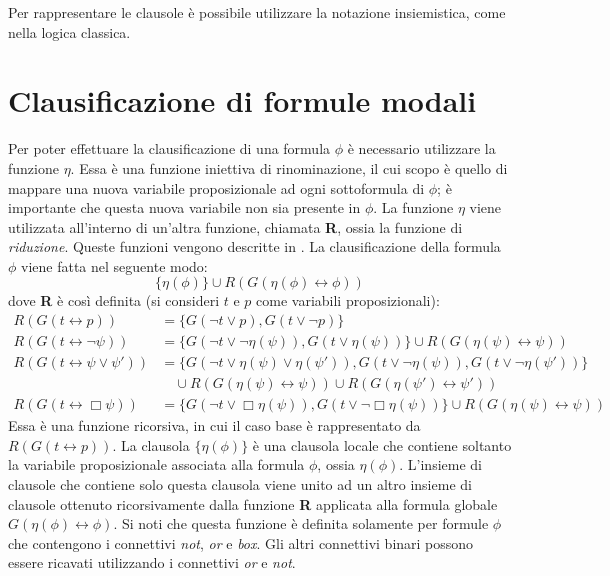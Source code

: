 \documentclass[a4paper,12pt]{report}
\newcommand{\tto} {\leftrightarrow}
\begin{document}
Per rappresentare le clausole è possibile utilizzare la notazione insiemistica, come nella logica classica.

\section{Clausificazione di formule modali}
\label{modal_claus}
Per poter effettuare la clausificazione di una formula $\phi$ è necessario utilizzare la funzione $\eta$. Essa è una funzione iniettiva di rinominazione, il cui scopo è quello di mappare una nuova variabile proposizionale ad ogni sottoformula di $\phi$; è importante che questa nuova variabile non sia presente in $\phi$. La funzione $\eta$ viene utilizzata all'interno di un'altra funzione, chiamata \textbf{R}, ossia la funzione di \emph{riduzione}. Queste funzioni vengono descritte in \cite{Articolo_resolution}. La clausificazione della formula $\phi$ viene fatta nel seguente modo:
\[ \{ \eta(\phi) \} \cup R(G(\eta(\phi) \tto \phi)) \]
dove \textbf{R} è così definita (si consideri $t$ e $p$ come variabili proposizionali):
\[
\begin{aligned}
R(G(t \tto p)) &= \{ G(\lnot t \lor p), G(t \lor \lnot p) \} \\
R(G(t \tto \lnot \psi)) &= \{ G(\lnot t \lor \lnot \eta(\psi)), G(t \lor \eta(\psi)) \} \cup R(G(\eta(\psi) \tto \psi)) \\
R(G(t \tto \psi \lor \psi')) &= \{ G(\lnot t \lor \eta(\psi) \lor \eta(\psi')), G(t \lor \lnot \eta(\psi)), G(t \lor \lnot \eta(\psi')) \} \\
& \quad \cup R(G(\eta(\psi) \tto \psi)) \cup R(G(\eta(\psi') \tto \psi')) \\
R(G(t \tto \Box \psi)) &= \{ G(\lnot t \lor \Box \eta(\psi)), G(t \lor \lnot \Box \eta(\psi)) \} \cup R(G(\eta(\psi) \tto \psi))
\end{aligned}
\]
Essa è una funzione ricorsiva, in cui il caso base è rappresentato da $R(G(t \tto p))$. La clausola $\{\eta(\phi)\}$ è una clausola locale che contiene soltanto la variabile proposizionale associata alla formula $\phi$, ossia $\eta(\phi)$. L'insieme di clausole che contiene solo questa clausola viene unito ad un altro insieme di clausole ottenuto ricorsivamente dalla funzione \textbf{R} applicata alla formula globale $G(\eta(\phi) \tto \phi)$. Si noti che questa funzione è definita solamente per formule $\phi$ che contengono i connettivi \emph{not}, \emph{or} e \emph{box}. Gli altri connettivi binari possono essere ricavati utilizzando i connettivi \emph{or} e \emph{not}.
\end{document}

